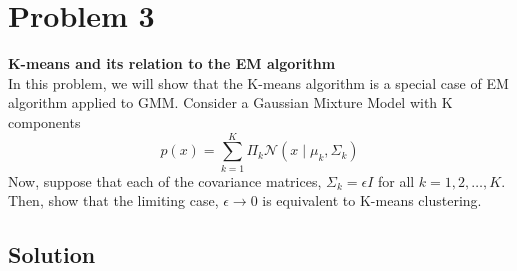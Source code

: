 \section*{Problem 3}

\textbf{K-means and its relation to the EM algorithm}\\
In this problem, we will show that the K-means algorithm is a special case of EM algorithm applied to GMM.\@
Consider a Gaussian Mixture Model with K components
\[
    p(x)=\sum_{k=1}^{K} \Pi_{k} \mathcal{N}\left(x \mid \mu_{k}, \Sigma_{k}\right)
\]
Now, suppose that each of the covariance matrices, \( \Sigma_{k}=\epsilon I \) for all \( k=1,2, \ldots, K \).
Then, show that the limiting case, \( \epsilon \rightarrow 0 \) is equivalent to K-means clustering.

\subsection*{Solution}
